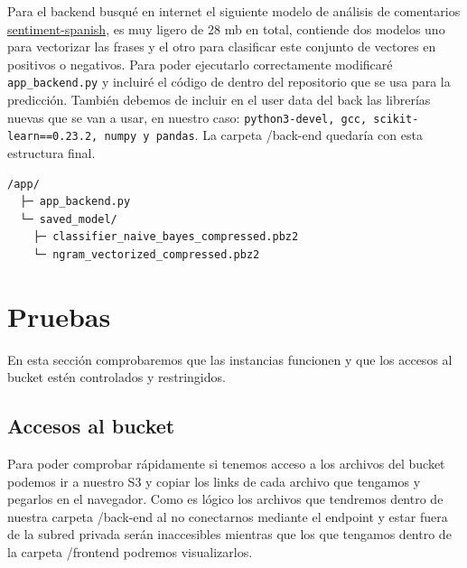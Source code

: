\documentclass{article}
\begin{document}
	Para el backend busqué en internet el siguiente modelo de análisis de comentarios \href{https://github.com/sentiment-analysis-spanish/sentiment-spanish}{sentiment-spanish}, es muy ligero de 28 mb en total, contiende dos modelos uno para vectorizar las frases y el otro para clasificar este conjunto de vectores en positivos o negativos. Para poder ejecutarlo correctamente modificaré \verb|app_backend.py| y incluiré el código de dentro del repositorio que se usa para la predicción. También debemos de incluir en el user data del back las librerías nuevas que se van a usar, en nuestro caso: \verb|python3-devel, gcc, scikit-learn==0.23.2, numpy y pandas|. La carpeta /back-end quedaría con esta estructura final.

	\begin{lstlisting}[style=consola, language=bash, caption={/back-end}]
 /app/
  ├─ app_backend.py
  └─ saved_model/
    ├─ classifier_naive_bayes_compressed.pbz2
    └─ ngram_vectorized_compressed.pbz2\end{lstlisting}


	\section{Pruebas}

	En esta sección comprobaremos que las instancias funcionen y que los accesos al bucket estén controlados y restringidos.

	\subsection{Accesos al bucket}

	Para poder comprobar rápidamente si tenemos acceso a los archivos del bucket podemos ir a nuestro S3 y copiar los links de cada archivo que tengamos y pegarlos en el navegador. Como es lógico los archivos que tendremos dentro de nuestra carpeta /back-end al no conectarnos mediante el endpoint y estar fuera de la subred privada serán inaccesibles mientras que los que tengamos dentro de la carpeta /frontend podremos visualizarlos.
\end{document}
